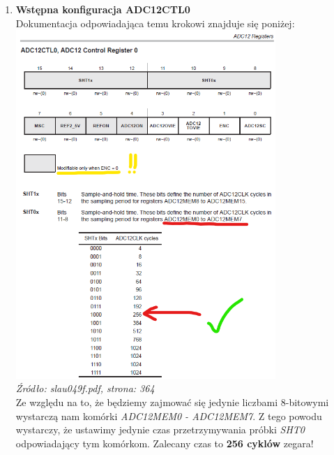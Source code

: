 \documentclass{article}
\begin{document}
\begin{enumerate}[label=\arabic*.]
    \item \textbf{Wstępna konfiguracja ADC12CTL0}
\vspace{3mm} \\
Dokumentacja odpowiadająca temu krokowi znajduje się poniżej: \\
\includegraphics[width=0.775\textwidth]{"../img/slau049f_364.png"} \\
\textit{Źródło: slau049f.pdf, strona: 364}
\vspace{3mm} \\
Ze względu na to, że będziemy zajmować się jedynie liczbami 8-bitowymi wystarczą nam komórki \textit{ADC12MEM0 - ADC12MEM7}.
Z tego powodu wystarczy, że ustawimy jedynie czas przetrzymywania próbki \textit{SHT0} odpowiadający tym komórkom. Zalecany czas to \textbf{256 cyklów} zegara! \\
\vspace{3mm} \\

\end{enumerate}
\end{document}
